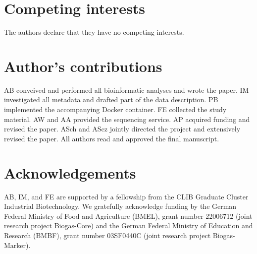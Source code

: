 \documentclass{bmcart}
\begin{document}
\begin{backmatter}

\section*{Competing interests}
The authors declare that they have no competing interests.

\section*{Author's contributions}
AB conveived and performed all bioinformatic analyses and wrote the paper.
IM investigated all metadata and drafted part of the data description.
PB implemented the accompanying Docker container.
FE collected the study material.
AW and AA provided the sequencing service.
AP acquired funding and revised the paper.
ASch and AScz jointly directed the project and extensively revised the paper.
All authors read and approved the final manuscript.

\section*{Acknowledgements}
AB, IM, and FE are supported by a fellowship from the CLIB Graduate Cluster Industrial Biotechnology.
We gratefully acknowledge funding by the German Federal Ministry of Food and Agriculture (BMEL), grant number 22006712 (joint research project Biogas-Core) and the German Federal Ministry of Education and Research (BMBF), grant number 03SF0440C (joint research project Biogas-Marker).




\end{backmatter}
\end{document}
